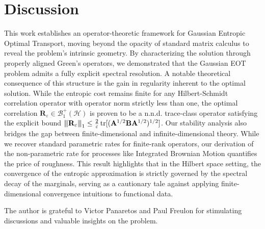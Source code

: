 \documentclass[noinfoline]{imsart}\setcounter{tocdepth}{2}
\newcommand{\m}[1]{\mathbf{#1}}
\renewcommand{\c}[1]{\mathcal{#1}}
\DeclareMathOperator{\tr}{tr}
\newcommand{\vertii}[1]{{\vert\kern-0.25ex\vert\kern-0.25ex\vert #1 
    \vert\kern-0.25ex\vert\kern-0.25ex\vert}} %
\theoremstyle{plain}
\begin{document}
\section{Discussion}
This work establishes an operator-theoretic framework for Gaussian Entropic Optimal Transport, moving beyond the opacity of standard matrix calculus to reveal the problem's intrinsic geometry. By characterizing the solution through properly aligned Green's operators, we demonstrated that the Gaussian EOT problem admits a fully explicit spectral resolution. A notable theoretical consequence of this structure is the gain in regularity inherent to the optimal solution. While the entropic cost remains finite for any Hilbert-Schmidt correlation operator with operator norm strictly less than one, the optimal correlation $\m{R}_{\varepsilon} \in \c{B}_{1}^{+}(\c{H})$ is proven to be a n.n.d. trace-class operator satisfying the explicit bound $\vertii{\m{R}_{\varepsilon}}_1 \le \frac{2}{\varepsilon} \tr[(\m{A}^{1/2} \m{B} \m{A}^{1/2})^{1/2}]$. Our stability analysis also bridges the gap between finite-dimensional and infinite-dimensional theory. While we recover standard parametric rates for finite-rank operators, our derivation of the non-parametric rate for processes like Integrated Brownian Motion quantifies the price of roughness. This result highlights that in the Hilbert space setting, the convergence of the entropic approximation is strictly governed by the spectral decay of the marginals, serving as a cautionary tale against applying finite-dimensional convergence intuitions to functional data.

\begin{acks}[Acknowledgments]
The author is grateful to Victor Panaretos and Paul Freulon for stimulating discussions and valuable insights on the problem.
\end{acks}


 

\newpage
\end{document}
